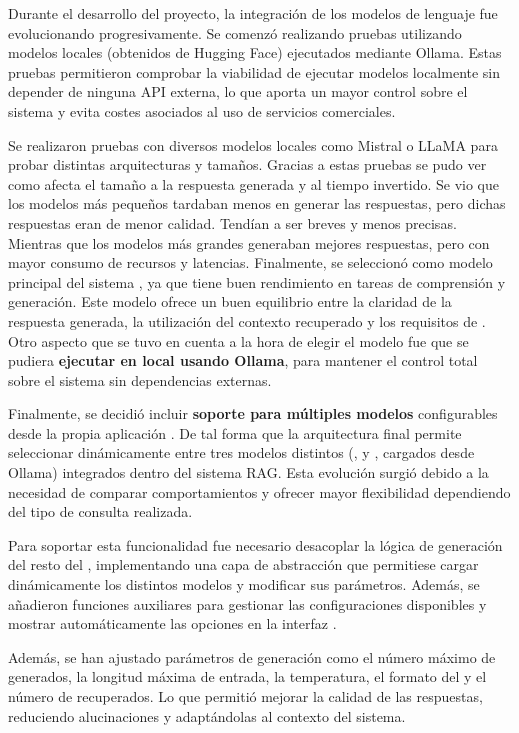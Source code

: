 Durante el desarrollo del proyecto, la integración de los modelos de lenguaje fue evolucionando progresivamente. Se comenzó realizando pruebas utilizando modelos locales (obtenidos de Hugging Face) ejecutados mediante Ollama. Estas pruebas permitieron comprobar la viabilidad de ejecutar modelos localmente sin depender de ninguna API externa, lo que aporta un mayor control sobre el sistema y evita costes asociados al uso de servicios comerciales.

Se realizaron pruebas con diversos modelos locales como Mistral o LLaMA para probar distintas arquitecturas y tamaños. Gracias a estas pruebas se pudo ver como afecta el tamaño a la respuesta generada y al tiempo invertido. Se vio que los modelos más pequeños tardaban menos en generar las respuestas, pero dichas respuestas eran de menor calidad. Tendían a ser breves y menos precisas. Mientras que los modelos más grandes generaban mejores respuestas, pero con mayor consumo de recursos y latencias. Finalmente, se seleccionó como modelo principal del sistema , ya que tiene buen rendimiento en tareas de comprensión y generación. Este modelo ofrece un buen equilibrio entre la claridad de la respuesta generada, la utilización del contexto recuperado y los requisitos de . Otro aspecto que se tuvo en cuenta a la hora de elegir el modelo fue que se pudiera \textbf{ejecutar en local usando Ollama}, para mantener el control total sobre el sistema sin dependencias externas. 
 
Finalmente, se decidió incluir \textbf{soporte para múltiples modelos} configurables desde la propia aplicación . De tal forma que la arquitectura final permite seleccionar dinámicamente entre tres modelos distintos (,  y , cargados desde Ollama) integrados dentro del sistema RAG. Esta evolución surgió debido a la necesidad de comparar comportamientos y ofrecer mayor flexibilidad dependiendo del tipo de consulta realizada.  
 
Para soportar esta funcionalidad fue necesario desacoplar la lógica de generación del resto del , implementando una capa de abstracción que permitiese cargar dinámicamente los distintos modelos y modificar sus parámetros. Además, se añadieron funciones auxiliares para gestionar las configuraciones disponibles y mostrar automáticamente las opciones en la interfaz .
 
Además, se han ajustado parámetros de generación como el número máximo de  generados, la longitud máxima de entrada, la temperatura, el formato del  y el número de  recuperados. Lo que permitió mejorar la calidad de las respuestas, reduciendo alucinaciones y adaptándolas al contexto del sistema.


